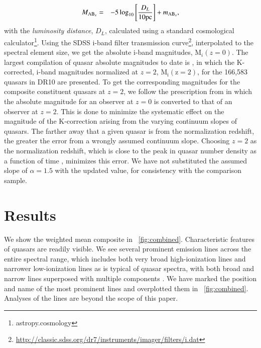 \documentclass{aa}    %
\newcommand{\figref}[1]{\ref{fig:#1}}
\newcommand{\Fig}[1]{\figurename~\figref{#1}}
\newcommand{\fig}[1]{\Fig{#1}}
\newcommand{\eqlabel}[1]{\label{eq:#1}}
\newcommand{\sectlabel}[1]{\label{sect:#1}}
\begin{document}
\begin{eqnarray}\eqlabel{absmag}
M_{\textmd{AB}_x} &=& -5 \log_{10} \left[  \frac{D_L }{10 \mathrm{pc}}   \right]
+ m_{\textmd{AB}_x} ,
\end{eqnarray}
with the \textit{luminosity distance}, $D_L$,  calculated using a standard
cosmological calculator\footnote{astropy.cosmology}. Using the SDSS i-band filter transmission curve\footnote{\url{http://classic.sdss.org/dr7/instruments/imager/filters/i.dat}}, interpolated to the spectral element size, we get the absolute i-band magnitudes, M$_i(z=0)$.
The largest compilation of quasar absolute magnitudes to date is
\cite{Paris2014}, in which the K-corrected, i-band magnitudes normalized at $z = 2$, $\mathrm{M_i (z=2)}$, for the 166,583 quasars in DR10 are
presented. To get the corresponding magnitudes for the composite constituent
quasars at $z = 2$, we follow the prescription from \cite{Richards2006b} in which the absolute magnitude for an observer at $z = 0$ is converted to that of an observer at $z = 2$. This is done to minimize the systematic effect on the magnitude of the K-correction arising from the varying continuum slopes of quasars. The farther away that a given quasar is from the normalization redshift, the greater the error from a wrongly assumed continuum slope. Choosing $z = 2$ as the normalization redshift, which is close to the peak in quasar number density as a function of time \citep{Richards2006b, Hopkins2007}, minimizes this error. We have not substituted the assumed slope of $\alpha
  = 1.5$ with the updated value, for consistency with the comparison sample.




\section{Results}   \sectlabel{results}


We show the weighted mean composite in \fig{combined}. Characteristic features
of quasars are readily visible. We see several prominent emission lines across
the entire spectral range, which includes both very broad high-ionization lines
and narrower low-ionization lines as is typical of quasar spectra, with both
broad and narrow lines superposed with multiple components \citep{Baldwin1995}.
We have marked the position and name of the most prominent lines and overplotted
them in \fig{combined}.  Analyses of the lines are beyond the scope of this
paper.
\end{document}
